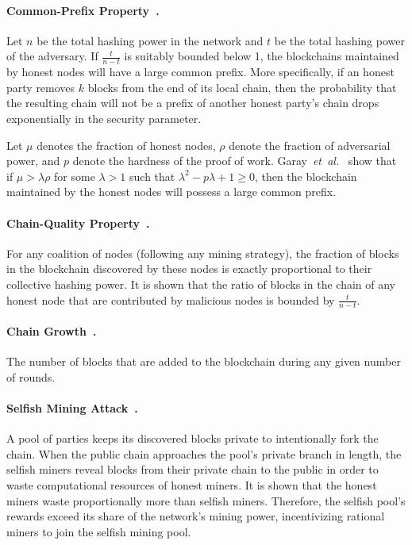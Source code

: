 \documentclass[11pt]{article}
\newcommand{\etal}{\textit{et~al.}}
\theoremstyle{mytheoremstyle}
\begin{document}
\paragraph{Common-Prefix Property~\cite{garay2015bitcoin}.} Let $n$ be the total hashing power in the network and $t$ be the total hashing power of the adversary. If $\frac{t}{n-t}$ is suitably bounded below 1, the blockchains maintained by honest nodes will have a large common prefix. More specifically, if an honest party removes $k$ blocks from the end of its local chain, then the probability that the resulting chain will not be a prefix of another honest party's chain drops exponentially in the security parameter. 

Let $\mu$ denotes the fraction of honest nodes, $\rho$ denote the fraction of adversarial power, and $p$ denote the hardness of the proof of work. Garay~\etal~\cite{garay2015bitcoin} show that if $\mu > \lambda\rho$ for some $\lambda > 1$ such that $\lambda^2 - p\lambda + 1 \geq 0$, then the blockchain maintained by the honest nodes will possess a large common prefix.

\paragraph{Chain-Quality Property~\cite{garay2015bitcoin}.} For any coalition of nodes (following any mining strategy), the fraction of blocks in the blockchain discovered by these nodes is exactly proportional to their collective hashing power. It is shown that the ratio of blocks in the chain of any honest node that are contributed by malicious nodes is bounded by $\frac{t}{n-t}$.

\paragraph{Chain Growth~\cite{cryptoeprint:2016:545}.} The number of blocks that are added to the blockchain during any given number of rounds.

\paragraph{Selfish Mining Attack~\cite{eyal2014}.} A pool of parties keeps its discovered blocks private to intentionally fork the chain. When the public chain approaches the pool's private branch in length, the selfish miners reveal blocks from their private chain to the public in order to waste computational resources of honest miners. It is shown that the honest miners waste proportionally more than selfish miners. Therefore, the selfish pool's rewards exceed its share of the network's mining power, incentivizing rational miners to join the selfish mining pool.
\end{document}
